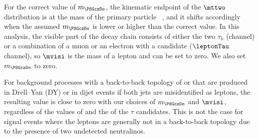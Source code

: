 For the correct value of $m_{\PSGczDo}$, the kinematic endpoint of the $\mttwo$ distribution is at the mass of the primary particle ~\cite{Affolder:2000bpa,Abazov:2002bu}, and it shifts accordingly when the assumed $m_{\PSGczDo}$ is lower or higher than the correct value. In this analysis, 
the visible part of the decay chain consists of either the two $\tau_h$ (\tauTau channel)
or a combination of a muon or an electron with a \Tau candidate ($\leptonTau$ channel), so $\mvisi$ is the mass of a lepton and can be set to zero. We also set $m_{\PSGczDo}$ to zero. 


For background processes with a back-to-back topology of \tauTau  or \leptonTau  that are produced in Drell--Yan (DY) or in dijet events if both jets 
are misidentified as leptons, the resulting \mttwo value is close to zero with our choices of $m_{\PSGczDo}$ and $\mvisi$, regardless of the values of 
\MPT and the \PT of  the $\tau$ candidates. This is not the case for signal events where the leptons are generally not in a back-to-back topology due 
to the presence of two undetected neutralinos.
